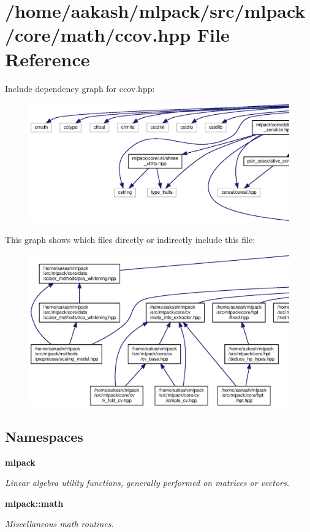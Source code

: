 \section{/home/aakash/mlpack/src/mlpack/core/math/ccov.hpp File Reference}
\label{ccov_8hpp}
Include dependency graph for ccov.\+hpp\+:
\nopagebreak
\begin{figure}[H]
\begin{center}
\leavevmode
\includegraphics[width=350pt]{ccov_8hpp__incl}
\end{center}
\end{figure}
This graph shows which files directly or indirectly include this file\+:
\nopagebreak
\begin{figure}[H]
\begin{center}
\leavevmode
\includegraphics[width=350pt]{ccov_8hpp__dep__incl}
\end{center}
\end{figure}
\subsection*{Namespaces}
\begin{DoxyCompactItemize}
\item 
 \textbf{ mlpack}
\begin{DoxyCompactList}\small\item\em Linear algebra utility functions, generally performed on matrices or vectors. \end{DoxyCompactList}\item 
 \textbf{ mlpack\+::math}
\begin{DoxyCompactList}\small\item\em Miscellaneous math routines. \end{DoxyCompactList}\end{DoxyCompactItemize}
